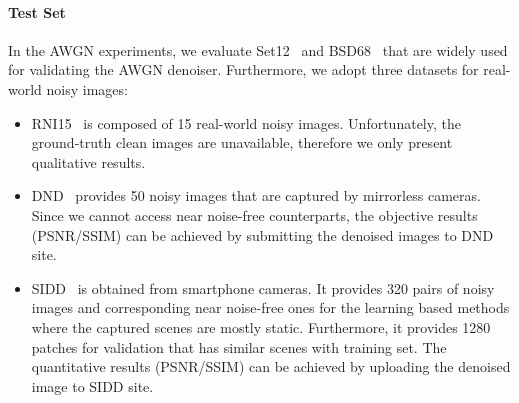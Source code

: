 \documentclass[10pt,twocolumn,letterpaper]{article}
\begin{document}
\paragraph{Test Set}
In the AWGN experiments, we evaluate Set12~\cite{zhang2017beyond} and BSD68~\cite{roth2009fields} that are widely used for validating the AWGN denoiser.
Furthermore, we adopt three datasets for real-world noisy images:
\begin{itemize}
	\item RNI15~\cite{lebrun2015noise} is composed of 15 real-world noisy images. Unfortunately, the ground-truth clean images are unavailable, therefore we only present qualitative results.
	
	\item DND~\cite{plotz2017benchmarking} provides 50 noisy images that are captured by mirrorless cameras. 
	Since we cannot access near noise-free counterparts, the objective results (PSNR/SSIM) can be achieved by submitting the denoised images to DND site. 	
	
	\item SIDD~\cite{abdelhamed2018high} is obtained from smartphone cameras. 
	It provides 320 pairs of noisy images and corresponding near noise-free ones for the learning based methods where the captured scenes are mostly static.
	Furthermore, it provides 1280 patches for validation that has similar scenes with training set.
	The quantitative results (PSNR/SSIM) can be achieved by uploading the denoised image to SIDD site. 
\end{itemize}
 
\end{document}
